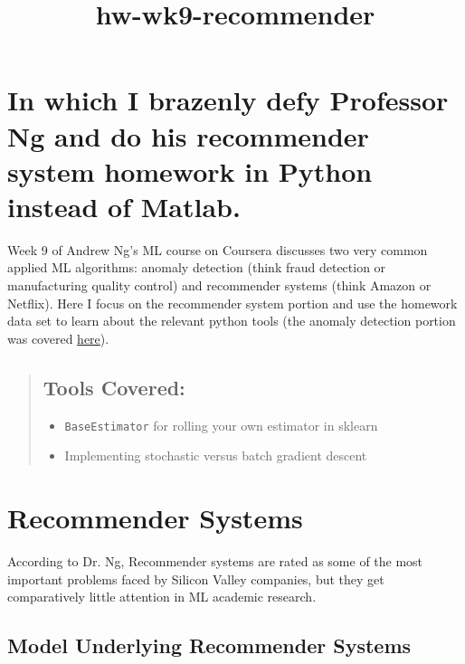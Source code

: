 \documentclass[11pt]{article}
\title{hw-wk9-recommender}
\providecommand{\tightlist}{%
      \setlength{\itemsep}{0pt}\setlength{\parskip}{0pt}}
\begin{document}
    
    
    \maketitle
    
    

    
    \section{In which I brazenly defy Professor Ng and do his recommender
system homework in Python instead of
Matlab.}\label{in-which-i-brazenly-defy-professor-ng-and-do-his-recommender-system-homework-in-python-instead-of-matlab.}

Week 9 of Andrew Ng's ML course on Coursera discusses two very common
applied ML algorithms: anomaly detection (think fraud detection or
manufacturing quality control) and recommender systems (think Amazon or
Netflix). Here I focus on the recommender system portion and use the
homework data set to learn about the relevant python tools (the anomaly
detection portion was covered
\href{http://sdsawtelle.github.io/blog/output/week9-anomaly-andrew-ng-machine-learning-with-python.html}{here}).

\begin{quote}
\subsection{Tools Covered:}\label{tools-covered}

\begin{itemize}
\tightlist
\item
  \texttt{BaseEstimator} for rolling your own estimator in sklearn
\item
  Implementing stochastic versus batch gradient descent
\end{itemize}
\end{quote}

    \section{Recommender Systems}\label{recommender-systems}

According to Dr. Ng, Recommender systems are rated as some of the most
important problems faced by Silicon Valley companies, but they get
comparatively little attention in ML academic research.

\subsection{Model Underlying Recommender
Systems}\label{model-underlying-recommender-systems}
\end{document}
